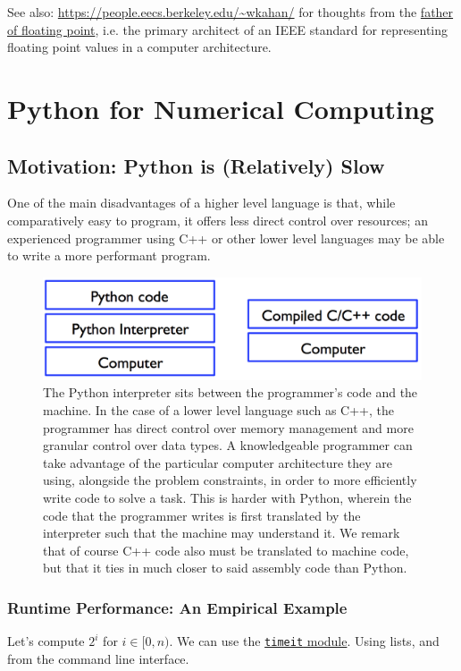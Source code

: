 \documentclass[12pt,letterpaper,twoside]{article}
\begin{document}
See also: \url{https://people.eecs.berkeley.edu/~wkahan/} for thoughts
from the \href{https://en.wikipedia.org/wiki/William_Kahan}{father of
  floating point}, i.e. the primary architect of an IEEE standard for
representing floating point values in a computer architecture. 


\section{Python for Numerical Computing}
\subsection{Motivation: Python is (Relatively) Slow}
One of the main disadvantages of a higher level language is that, while
comparatively easy to program, it offers less direct control over
resources; an experienced programmer using C++ or other lower level
languages
may be able to write a more performant program.

\begin{figure}[h]
\centering
\includegraphics[scale=0.45]{fig/python-v-compiled.png}
\caption{\footnotesize The Python interpreter sits between the programmer's code and
the machine. In the case of a lower level language such as C++, the
programmer has direct control over memory management and more granular
control over data types. A knowledgeable programmer can take advantage
of the particular computer architecture they are using, alongside the
problem constraints, in order to more efficiently write code to solve
a task. This is harder with Python, wherein the code that the
programmer writes is first translated by the interpreter such that the
machine may understand it. We remark that of course C++ code also must
be translated to machine code, but that it ties in much closer to said
assembly code than Python.}
\end{figure}

\subsubsection{Runtime Performance: An Empirical Example}
Let's compute \(2^i\) for \(i \in [0,n)\). We can use the
\href{https://docs.python.org/3/library/timeit.html#basic-examples}{\texttt{timeit} module}.
Using lists, and from the command line
interface.
\end{document}
